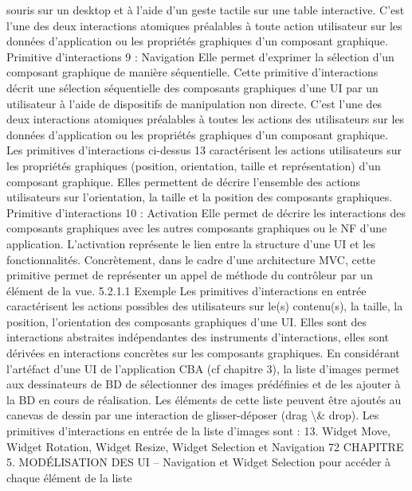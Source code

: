 \documentclass{article}
\begin{document}
souris sur un desktop et \`{a} l’aide d’un geste tactile sur une table interactive. C’est l’une des deux interactions atomiques pr\'{e}alables \`{a} toute action utilisateur sur les donn\'{e}es d’application ou les propri\'{e}t\'{e}s
graphiques d’un composant graphique.
Primitive d’interactions 9 : Navigation
Elle permet d’exprimer la s\'{e}lection d’un composant graphique de mani\`{e}re
s\'{e}quentielle.
Cette primitive d’interactions d\'{e}crit une s\'{e}lection s\'{e}quentielle des composants graphiques d’une UI
par un utilisateur \`{a} l’aide de dispositifs de manipulation non directe. C’est l’une des deux interactions
atomiques pr\'{e}alables \`{a} toutes les actions des utilisateurs sur les donn\'{e}es d’application ou les propri\'{e}t\'{e}s
graphiques d’un composant graphique.
Les primitives d’interactions ci-dessus 13 caract\'{e}risent les actions utilisateurs sur les propri\'{e}t\'{e}s
graphiques (position, orientation, taille et repr\'{e}sentation) d’un composant graphique. Elles permettent
de d\'{e}crire l’ensemble des actions utilisateurs sur l’orientation, la taille et la position des composants
graphiques.
Primitive d’interactions 10 : Activation
Elle permet de d\'{e}crire les interactions des composants graphiques avec les
autres composants graphiques ou le NF d’une application.
L’activation repr\'{e}sente le lien entre la structure d’une UI et les fonctionnalit\'{e}s. Concr\`{e}tement, dans le
cadre d’une architecture MVC, cette primitive permet de repr\'{e}senter un appel de m\'{e}thode du contr\^{o}leur par un \'{e}l\'{e}ment de la vue.
5.2.1.1
Exemple
Les primitives d’interactions en entr\'{e}e caract\'{e}risent les actions possibles des utilisateurs sur le(s)
contenu(s), la taille, la position, l’orientation des composants graphiques d’une UI. Elles sont des
interactions abstraites ind\'{e}pendantes des instruments d’interactions, elles sont d\'{e}riv\'{e}es en interactions
concr\`{e}tes sur les composants graphiques. En consid\'{e}rant l’art\'{e}fact d’une UI de l’application CBA (cf
chapitre 3), la liste d’images permet aux dessinateurs de BD de s\'{e}lectionner des images pr\'{e}d\'{e}ﬁnies
et de les ajouter \`{a} la BD en cours de r\'{e}alisation. Les \'{e}l\'{e}ments de cette liste peuvent \^{e}tre ajout\'{e}s au
canevas de dessin par une interaction de glisser-d\'{e}poser (drag \textbackslash{}& drop). Les primitives d’interactions
en entr\'{e}e de la liste d’images sont :
13. Widget Move, Widget Rotation, Widget Resize, Widget Selection et Navigation
72
CHAPITRE 5. MODÉLISATION DES UI
– Navigation et Widget Selection pour acc\'{e}der \`{a} chaque \'{e}l\'{e}ment de la liste
\end{document}
